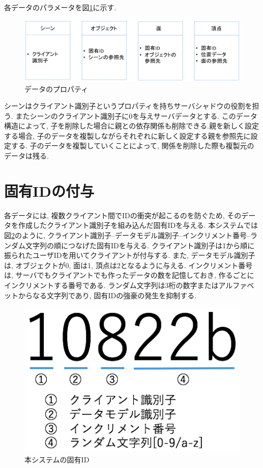 各データのパラメータを図\ref{プロパティ}に示す.
\begin{figure}[htbp]
  \begin{center}
    \includegraphics[scale=0.3]{images/prop}
    \caption{データのプロパティ}
    \label{プロパティ}
  \end{center}
\end{figure}
シーンはクライアント識別子というプロパティを持ちサーバシャドウの役割を担う.
またシーンのクライアント識別子に0を与えサーバデータとする.
このデータ構造によって, 子を削除した場合に親との依存関係も削除できる.親を新しく設定する場合, 子のデータを複製しながらそれぞれに新しく設定する親を参照先に設定する.
子のデータを複製していくことによって, 関係を削除した際も複製元のデータは残る.
\section{固有IDの付与} \label{固有id}
各データには, 複数クライアント間でIDの衝突が起こるのを防ぐため, そのデータを作成したクライアント識別子を組み込んだ固有IDを与える.
本システムでは図\ref{uuid}のように, クライアント識別子--データモデル識別子--インクリメント番号--ランダム文字列の順につなげた固有IDを与える. クライアント識別子は1から順に振られたユーザIDを用いてクライアントが付与する. また, データモデル識別子は, オブジェクトが0, 面は1, 頂点は2となるように与える.
インクリメント番号は, サーバでもクライアントでも作ったデータの数を記憶しておき, 作るごとにインクリメントする番号である. ランダム文字列は3桁の数字またはアルファベットからなる文字列であり, 固有IDの強豪の発生を抑制する.
\begin{figure}[htbp]
  \begin{center}
    \includegraphics[scale=0.5]{images/uuid}
    \caption{本システムの固有ID}
    \label{uuid}
  \end{center}
\end{figure}
